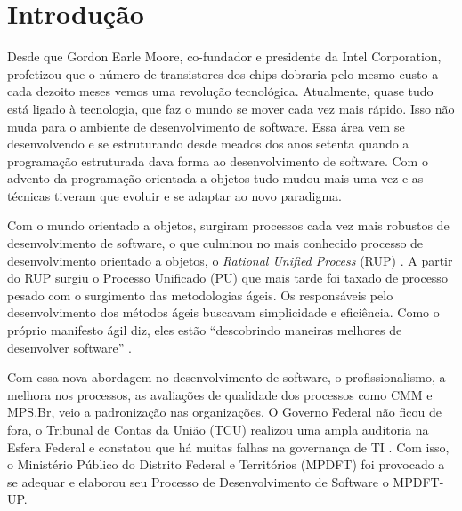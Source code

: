 \documentclass[
	article,			%
	11pt,				%
	oneside,			%
	a4paper,			%
	english,			%
	brazil,				%
	sumario=tradicional
	]{abntex2}
\begin{document}

\textual

\section*{Introdução}

Desde que Gordon Earle Moore, co-fundador e presidente da Intel Corporation,
profetizou que o número de transistores dos chips dobraria pelo mesmo custo a
cada dezoito meses vemos uma revolução tecnológica. Atualmente, quase tudo está
ligado à tecnologia, que faz o mundo se mover cada vez mais rápido. Isso não
muda para o ambiente de desenvolvimento de software. Essa área vem se
desenvolvendo e se estruturando desde meados dos anos setenta quando a
programação estruturada dava forma ao desenvolvimento de software. Com o advento
da programação orientada a objetos tudo mudou mais uma vez e as técnicas tiveram
que evoluir e se adaptar ao novo paradigma.

Com o mundo orientado a objetos, surgiram processos cada vez mais robustos de
desenvolvimento de software, o que culminou no mais conhecido processo de
desenvolvimento orientado a objetos, o \textit{Rational Unified Process} (RUP)
\cite{kruchten2004rational}. A partir do RUP surgiu o Processo Unificado (PU)
que mais tarde foi taxado de processo pesado com o surgimento das metodologias
ágeis. Os responsáveis pelo desenvolvimento dos métodos ágeis buscavam
simplicidade e eficiência. Como o próprio manifesto ágil diz, eles estão
``descobrindo maneiras melhores de desenvolver software'' \cite{agilemanifesto}.

Com essa nova abordagem no desenvolvimento de software, o profissionalismo, a
melhora nos processos, as avaliações de qualidade dos processos como CMM e
MPS.Br, veio a padronização nas organizações. O Governo Federal não ficou de
fora, o Tribunal de Contas da União (TCU) realizou uma ampla auditoria na Esfera
Federal e constatou que há muitas falhas na governança de TI
\cite{dou-20080818}. Com isso, o Ministério Público do Distrito Federal e
Territórios (MPDFT) foi provocado a se adequar e elaborou seu Processo de
Desenvolvimento de Software o MPDFT-UP.
\end{document}
